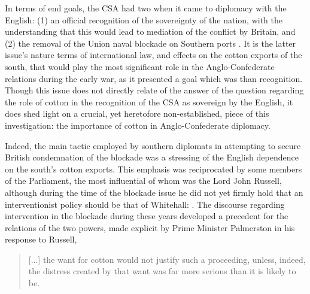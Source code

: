 In terms of end goals, the CSA had two when it came to diplomacy with the English: (1) an official recognition of the sovereignty of the nation, with the
understanding that this would lead to mediation of the conflict by Britain, and (2) the removal of the Union naval blockade on Southern ports
\Autocites()()[][383]{mcphersonBattleCry1988}[W.L. Yancey and A. Dudley Mann to Secretary of State R. Toombs, July 15, 1861, in:][45]{davismessagespapers1966}.
It is the latter issue's nature terms of international law, and effects on the cotton exports of the south, that would play the most significant role in
the Anglo-Confederate relations during the early war, as it presented a goal which was  than
recognition\autocite[John Slidell to Secretary of State R.M.T. Hunter, September 26, 1862, in:][187]{davismessagespapers1966}. Though this issue does not
directly relate of the answer of the question regarding the role of cotton in the recognition of the CSA as sovereign by the English, it does shed light on a 
crucial, yet heretofore non-established, piece of this investigation: the importance of cotton in Anglo-Confederate diplomacy. 

Indeed, the main tactic employed by southern diplomats in attempting to secure British condemnation of the blockade was a stressing of the English dependence 
on the south's cotton exports. This emphasis was reciprocated by some members of the Parliament, the most influential of whom was the Lord John Russell, although 
during the time of the blockade issue he did not yet firmly hold that an interventionist policy should be that of Whitehall: . \autocite[Russell to Palmerston, quoted in][Vol.I, p.199. There are two possible readings of what Russell said here, resting on one's interpretation of the phrase "It will not do". I have chosen to understand it, as I believe fits most reasonably within the context of the quote, as indicative of Russell's reservations regarding the breaking of the blockade, rather than a feeling that this action does not go far enough.]{adamsBritainAmericanWar1925}
The discourse regarding intervention in the blockade during these years developed a precedent for the relations of the two powers, made explicit by Prime Minister 
Palmerston in his response to Russell,
\begin{quote}
    [...] the want for cotton would not justify such a proceeding, unless, indeed, the distress created by that want was far more serious than it is likely to be.
    \Autocite[Vol.I, p.199]{adamsBritainAmericanWar1925}
\end{quote}

